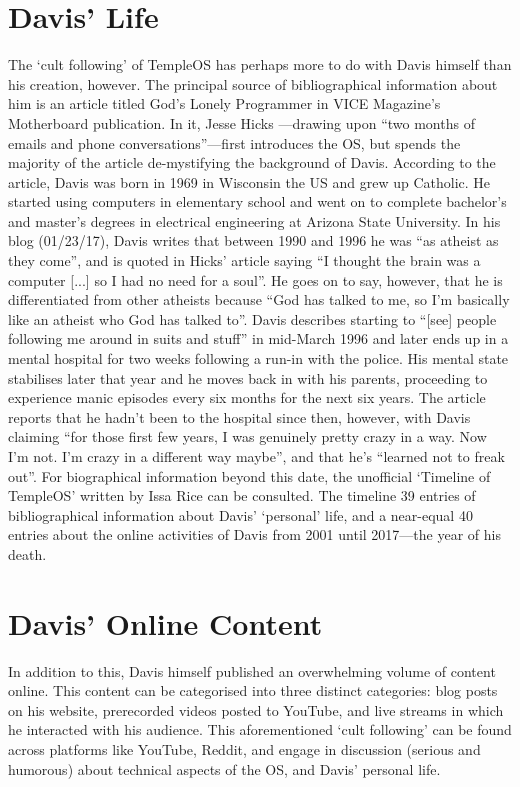 \documentclass{article}
\begin{document}
\section*{Davis' Life}
The `cult following' of TempleOS has perhaps
more to do with Davis himself than his creation, however.
The principal source of bibliographical information about him is
an article titled God’s Lonely Programmer
in VICE Magazine’s Motherboard publication.
In it, Jesse Hicks \parencite*{Hicks14}---drawing
upon ``two months of emails and phone conversations''---first
introduces the OS,
but spends the majority of the article de-mystifying the background of Davis.
According to the article,
Davis was born in 1969 in Wisconsin the US and grew up Catholic.
He started using computers in elementary school
and went on to complete bachelor's and master's degrees
in electrical engineering at Arizona State University.
In his blog (01/23/17), Davis writes that
between 1990 and 1996 he was ``as atheist as they come'',
and is quoted in Hicks' article saying
``I thought the brain was a computer [...] so I had no need for a soul''.
He goes on to say, however, that he is differentiated from other atheists
because ``God has talked to me,
so I'm basically like an atheist who God has talked to''.
Davis describes starting to
``[see] people following me around in suits and stuff'' in mid-March 1996
and later ends up in a mental hospital for two weeks
following a run-in with the police.
His mental state stabilises later that year
and he moves back in with his parents,
proceeding to experience manic episodes every six months for the next six years.
The article reports that he hadn't been to the hospital since then, however,
with Davis claiming
``for those first few years, I was genuinely pretty crazy in a way.
Now I'm not. I'm crazy in a different way maybe'',
and that he's ``learned not to freak out''.
For biographical information beyond this date,
the unofficial `Timeline of TempleOS' written by Issa Rice
\parencite*{Rice18} can be consulted.
The timeline 39 entries of bibliographical information
about Davis' `personal' life, and a near-equal 40 entries about
the online activities of Davis from 2001 until 2017---the year of his death.

\section*{Davis' Online Content}
In addition to this,
Davis himself published an overwhelming volume of content online.
This content can be categorised into three distinct categories:
blog posts on his website,
prerecorded videos posted to YouTube,
and live streams in which he interacted with his audience.
This aforementioned `cult following' can be found across platforms like
YouTube, Reddit,
and engage in discussion (serious and humorous) about
technical aspects of the OS, and Davis’ personal life.
\end{document}
